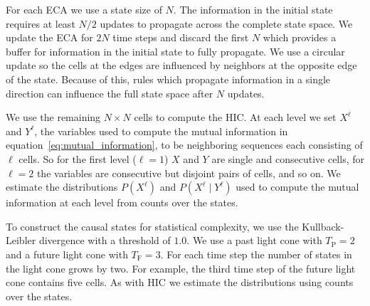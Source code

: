 For each ECA we use a state size of $N$. The information in the initial state
requires at least $N/2$ updates to propagate across the complete state space.
We update the ECA for $2N$ time steps and discard the first $N$ which provides
a buffer for information in the initial state to fully propagate. We use a
circular update so the cells at the edges are influenced by neighbors at the
opposite edge of the state.  Because of this, rules which propagate information
in a single direction can influence the full state space after $N$ updates.

We use the remaining $N \times N$ cells to compute the HIC. At each level we
set $X^\ell$ and $Y^\ell$, the variables used to compute the mutual information
in equation~\ref{eq:mutual_information}, to be neighboring sequences each
consisting of $\ell$ cells. So for the first level ($\ell = 1$) $X$ and $Y$ are
single and consecutive cells, for $\ell = 2$ the variables are consecutive but
disjoint pairs of cells, and so on. We estimate the distributions $P(X^\ell)$
and $P(X^\ell \mid Y^\ell)$ used to compute the mutual information at each
level from counts over the states.

To construct the causal states for statistical complexity, we use the
Kullback-Leibler divergence with a threshold of $1.0$. We use a past light cone
with $T_{\textrm{P}}=2$ and a future light cone with $T_{\textrm{F}} = 3$.  For
each time step the number of states in the light cone grows by two. For
example, the third time step of the future light cone contains five cells. As
with HIC we estimate the distributions using counts over the states.

